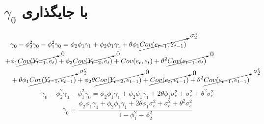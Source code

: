 \documentclass{article}
\begin{document}
\section*{$\gamma_0$ با جایگذاری}
\begin{align*}
   & \gamma_0 - \phi_2^2 \gamma_0 - \phi_1^2 \gamma_0 = \phi_2\phi_1 \gamma_{1} + \phi_2\phi_1 \gamma_{1} 
   + \theta \phi_1 \cancelto{\sigma_2^e}{Cov(e_{t-1}, Y_{t-1})}  \\
 + & \phi_1 \cancelto{0}{Cov(Y_{t-1}, e_{t}) }
 +   \phi_2 \cancelto{0}{Cov(Y_{t-2}, e_{t})}
 +   Cov(e_t, e_{t}) 
 +   \theta^2 \cancelto{0}{Cov(e_{t-1}, e_{t})}
    \\ &
 +   \theta\phi_1  \cancelto{\sigma_2^e}{Cov(Y_{t-1}, e_{t-1})}
 +   \phi_2\theta \cancelto{0}{Cov(Y_{t-2}, e_{t-1})}
 +   \cancelto{0}{Cov(e_t, e_{t-1}) }
 +   \theta^2 \cancelto{\sigma_2^e}{Cov(e_{t-1}, e_{t-1})}
\end{align*}
\[ \gamma_0 - \phi_2^2 \gamma_0 - \phi_1^2 \gamma_0 = \phi_2\phi_1 \gamma_{1} 
+ \phi_2\phi_1 \gamma_{1} + 2\theta \phi_1 \sigma^2_e + \sigma^2_e + \theta^2 \sigma^2_e \]
\[ \gamma_0 = \frac{\phi_2\phi_1 \gamma_{1} + \phi_2\phi_1 \gamma_{1} + 2\theta \phi_1 \sigma^2_e + \sigma^2_e + \theta^2 \sigma^2_e}{1-\phi_1^2 - \phi_2^2}\]
\end{document}
